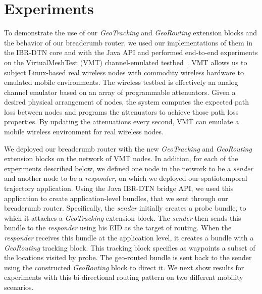 \section{Experiments}\label{sec:experiments}
To demonstrate the use of our {\em GeoTracking} and {\em GeoRouting}
extension blocks and the behavior of our {\sc breadcrumb} router, we
used our implementations of them in the IBR-DTN core and with the Java
API and performed end-to-end experiments on the VirtualMeshTest (VMT)
channel-emulated testbed~\cite{hahn10:using, kim11:reality}.  VMT
allows us to subject Linux-based real wireless nodes with commodity
wireless hardware to emulated mobile environments.  The wireless
testbed is effectively an analog channel emulator based on an array of
programmable attenuators.  Given a desired physical arrangement of
nodes, the system computes the expected path loss between nodes and
programs the attenuators to achieve those path loss properties.  By
updating the attenuations every second, VMT can emulate a mobile
wireless environment for real wireless nodes.

We deployed our {\sc breadcrumb} router with the new {\em GeoTracking}
and {\em GeoRouting} extension blocks on the network of VMT nodes. In
addition, for each of the experiments described below, we defined one
node in the network to be a {\em sender} and another node to be a {\em
  responder}, on which we deployed our spatiotemporal trajectory
application. Using the Java IBR-DTN bridge API, we used this
application to create application-level bundles, that we sent through
our {\sc breadcrumb} router. Specifically, the {\em sender} initially
creates a probe bundle, to which it attaches a {\em GeoTracking}
extension block. The {\em sender} then sends this bundle to the {\em
  responder} using his EID as the target of routing. When the {\em
  responder} receives this bundle at the application level, it creates
a bundle with a {\em GeoRouting} tracking block. This tracking block
specifies as waypoints a subset of the locations visited by probe. The
geo-routed bundle is sent back to the sender using the constructed
{\em GeoRouting} block to direct it. We next show results for
experiments with this bi-directional routing pattern on two different
mobility scenarios.

